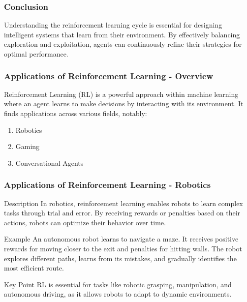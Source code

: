 \documentclass[aspectratio=169]{beamer}
\begin{document}
\begin{frame}[fragile]
    \frametitle{Conclusion}
    Understanding the reinforcement learning cycle is essential for designing intelligent systems that learn from their environment. By effectively balancing exploration and exploitation, agents can continuously refine their strategies for optimal performance.
\end{frame}

\begin{frame}[fragile]
    \frametitle{Applications of Reinforcement Learning - Overview}
    Reinforcement Learning (RL) is a powerful approach within machine learning where an agent learns to make decisions by interacting with its environment. It finds applications across various fields, notably:
    
    \begin{enumerate}
        \item Robotics
        \item Gaming
        \item Conversational Agents
    \end{enumerate}
\end{frame}

\begin{frame}[fragile]
    \frametitle{Applications of Reinforcement Learning - Robotics}
    \begin{block}{Description}
        In robotics, reinforcement learning enables robots to learn complex tasks through trial and error. By receiving rewards or penalties based on their actions, robots can optimize their behavior over time.
    \end{block}
    
    \begin{block}{Example}
        An autonomous robot learns to navigate a maze. It receives positive rewards for moving closer to the exit and penalties for hitting walls. The robot explores different paths, learns from its mistakes, and gradually identifies the most efficient route.
    \end{block}
    
    \begin{block}{Key Point}
        RL is essential for tasks like robotic grasping, manipulation, and autonomous driving, as it allows robots to adapt to dynamic environments.
    \end{block}
\end{frame}
\end{document}

